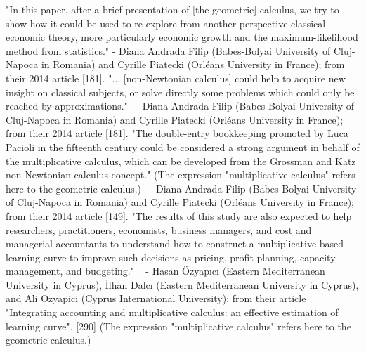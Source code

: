 \documentclass[12pt]{article}
\begin{document}
"In this paper, after a brief presentation of [the geometric] calculus, we try to show how it could be used to re-explore from another perspective classical economic theory, more particularly economic growth and the maximum-likelihood method from statistics." - Diana Andrada Filip (Babes-Bolyai University of Cluj-Napoca in Romania) and Cyrille Piatecki (Orléans University in France); from their 2014 article [181].
"... [non-Newtonian calculus] could help to acquire new insight on classical subjects, or solve directly some problems which could only be reached by approximations."  - Diana Andrada Filip (Babes-Bolyai University of Cluj-Napoca in Romania) and Cyrille Piatecki (Orléans University in France); from their 2014 article [181].
"The double-entry bookkeeping promoted by Luca Pacioli in the fifteenth century could be considered a strong argument in behalf of the multiplicative calculus, which can be developed from the Grossman and Katz non-Newtonian calculus concept." (The expression "multiplicative calculus" refers here to the geometric calculus.)  - Diana Andrada Filip (Babes-Bolyai University of Cluj-Napoca in Romania) and Cyrille Piatecki (Orléans University in France); from their 2014 article [149].
"The results of this study are also expected to help researchers, practitioners, economists, business managers, and cost and managerial accountants to understand how to construct a multiplicative based learning curve to improve such decisions as pricing, profit planning, capacity management, and budgeting."   - Hasan Özyapıcı (Eastern Mediterranean University in Cyprus), İlhan Dalcı (Eastern Mediterranean University in Cyprus), and Ali Ozyapici (Cyprus International University); from their article "Integrating accounting and multiplicative calculus: an effective estimation of learning curve". [290] (The expression "multiplicative calculus" refers here to the geometric calculus.)
\end{document}
